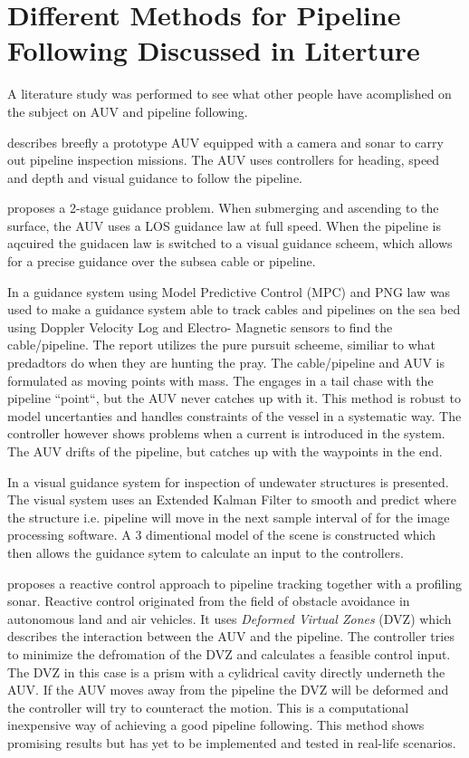 	
\section{Different Methods for Pipeline Following Discussed in Literture}
	A literature study was performed to see what other people have acomplished on the subject on AUV and 
	pipeline following. 

	\cite{piscis} describes breefly a prototype AUV equipped with a camera and sonar to carry out pipeline
	inspection missions. The AUV uses controllers for heading, speed and depth and visual guidance to
	follow the pipeline. 
	
	\cite{GuidanceReview} proposes a 2-stage guidance problem. When submerging and ascending to the surface, 
	the AUV uses a LOS guidance law at full speed. When the pipeline is aqcuired the guidacen law is switched 
	to a visual guidance scheem, which allows for a precise guidance over the subsea cable or pipeline. 
		
	In \cite{MPC_pure_pursuit} a guidance system using Model Predictive Control (MPC) and PNG law was used to make 
	a guidance system able to track cables and pipelines on the sea bed using Doppler Velocity Log and Electro-
	Magnetic sensors to find the cable/pipeline. The report utilizes the pure pursuit scheeme, similiar to what 
	predadtors do when they are hunting the pray. The cable/pipeline and AUV is formulated as moving points with 
	mass. The engages in a tail chase with the pipeline ``point``, but the AUV never catches up with it. This 
	method is robust to model uncertanties and handles constraints of the vessel in a systematic way. The controller
	however shows problems when a current is introduced in the system. The AUV drifts of the pipeline, but catches 
	up with the waypoints in the end.
	
	In \cite{Visual_inpsection_of_seabottom_by_AUV} a visual guidance system for inspection of undewater structures 
	is presented. The visual system uses an Extended Kalman Filter to smooth and predict where the structure i.e. 
	pipeline will move in the next sample interval of for the image processing software. A 3 dimentional model 
	of the scene is constructed which then allows the guidance sytem to calculate an input to the controllers.
	
	\cite{reactive_control_AUV} proposes a reactive control approach to pipeline tracking together with a 
	profiling sonar. Reactive control originated from the field of obstacle avoidance in autonomous land and air 
	vehicles. It uses \textit{Deformed Virtual Zones} (DVZ) which describes the interaction between the AUV and 
	the pipeline. The controller tries to minimize the defromation of the DVZ and calculates a feasible control input. 
	The DVZ in this case is a prism with a cylidrical cavity directly underneth the AUV. If the AUV moves away from 
	the pipeline the DVZ will be deformed and the controller will try to counteract the motion. This is a 
	computational inexpensive way of achieving a good pipeline following. This method shows promising results 
	but has yet to be implemented and tested in real-life scenarios. 
	
